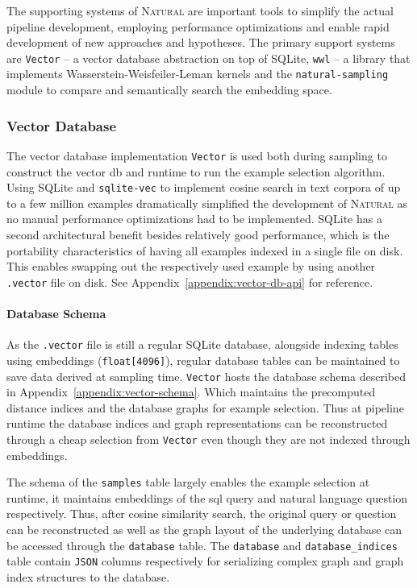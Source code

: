 The supporting systems of \textsc{Natural} are important tools to simplify the 
actual pipeline development, employing performance optimizations and enable
rapid development of new approaches and hypotheses. The primary support systems
are \texttt{Vector} – a vector database abstraction on top of SQLite,
\texttt{wwl} – a library that implements Wasserstein-Weisfeiler-Leman kernels
\citep{WWL} and the \texttt{natural-sampling} module to compare and semantically
search the embedding space.

\subsubsection{Vector Database}

The vector database implementation \texttt{Vector} is used both during
sampling to construct the vector db and runtime to run the example selection
algorithm. Using SQLite and \texttt{sqlite-vec} to implement cosine search in
text corpora of up to a few million examples dramatically simplified the
development of \textsc{Natural} as no manual performance optimizations had to
be implemented. SQLite has a second architectural benefit besides relatively
good performance, which is the portability characteristics of having all
examples indexed in a single file on disk. This enables swapping out the
respectively used example by using another \texttt{.vector} file on disk.
See Appendix~\ref{appendix:vector-db-api} for reference.

\paragraph{Database Schema}

As the \texttt{.vector} file is still a regular SQLite database, alongside
indexing tables using embeddings (\texttt{float[4096]}), regular database tables
can be maintained to save data derived at sampling time. \texttt{Vector} hosts
the database schema described in Appendix~\ref{appendix:vector-schema}. Which
maintains the precomputed distance indices and the database graphs for example
selection. Thus at pipeline runtime the database indices and graph
representations can be reconstructed through a cheap selection from
\texttt{Vector} even though they are not indexed through embeddings.

The schema of the \texttt{samples} table largely enables the example selection
at runtime, it maintains embeddings of the sql query and natural language
question respectively. Thus, after cosine similarity search, the original query
or question can be reconstructed as well as the graph layout of the underlying
database can be accessed through the \texttt{database} table. The
\texttt{database} and \texttt{database\_indices} table contain \texttt{JSON}
columns respectively for serializing complex graph and graph index structures
to the database.


